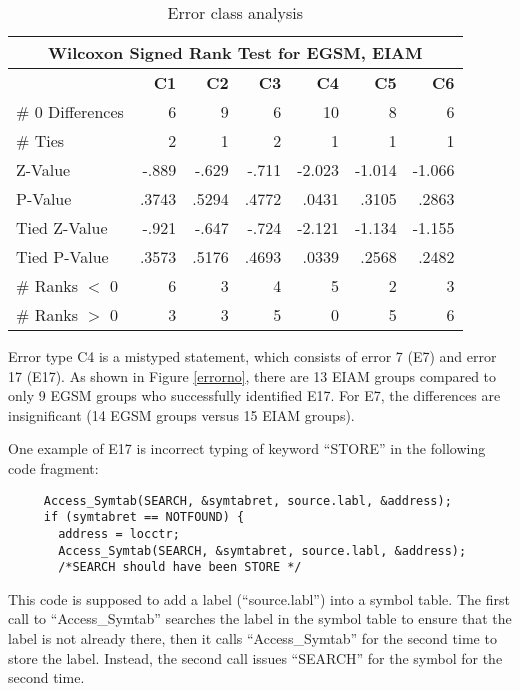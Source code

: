 \begin{table}[htb]
 \caption{Error class analysis }
 \begin{center}
 \begin{tabular}{|l|r|r|r|r|r|r|}
  \hline
  \multicolumn{7}{|c|}{\bf Wilcoxon Signed Rank Test for EGSM, EIAM}\\
  \hline
     & {\bf C1} & {\bf C2} & {\bf C3} & {\bf C4} & {\bf C5} & {\bf C6}\\
  \hline
  \# 0 Differences & 6     & 9    & 6     & 10    & 8     & 6\\
  \# Ties          & 2     & 1     & 2     & 1     & 1     & 1\\ 
  Z-Value          & -.889 & -.629 & -.711 & -2.023 & -1.014 & -1.066\\
  P-Value          & .3743 & .5294 & .4772 & .0431 & .3105 & .2863\\
  Tied Z-Value     & -.921 & -.647 & -.724 & -2.121 & -1.134 & -1.155\\
  Tied P-Value     & .3573 & .5176 & .4693 & .0339 & .2568 & .2482\\
  \# Ranks $<$ 0   & 6     & 3     & 4     & 5     & 2     & 3\\
  \# Ranks $>$ 0   & 3     & 3     & 5     & 0     & 5     & 6\\
  \hline
  \end{tabular}
  \end{center}
  \label{errorclass-analysis}
\end{table} 


Error type C4 is a mistyped statement, which consists of  error 7 (E7) and 
error 17 (E17). As shown in Figure \ref{errorno}, there are
13 EIAM groups compared to only 9 EGSM groups who successfully identified
E17. For E7, the differences are insignificant (14 EGSM groups versus
15 EIAM groups). 

One example of E17 is incorrect typing of keyword ``STORE'' in the
following code fragment:
\small
\begin{verbatim}
     Access_Symtab(SEARCH, &symtabret, source.labl, &address);
     if (symtabret == NOTFOUND) {
       address = locctr;
       Access_Symtab(SEARCH, &symtabret, source.labl, &address);
       /*SEARCH should have been STORE */
\end{verbatim}
\normalsize
This code is supposed to add a label (``source.labl'') into a
symbol table. The first 
call to ``Access\_Symtab'' searches the label in the symbol table to ensure
that the label is not already there, then it calls
``Access\_Symtab'' for the second time to store the label.
Instead, the second call issues ``SEARCH'' for the symbol for the
second time.  

